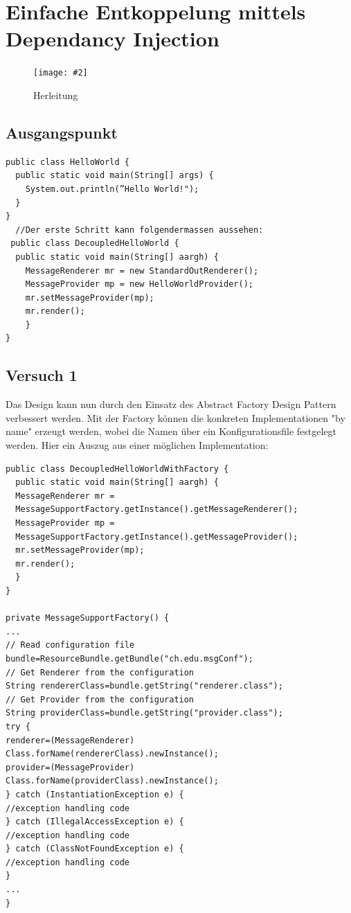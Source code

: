 \documentclass[a4paper,10pt]{scrreprt}
\newcommand{\pic}[2][figure]{\begin{figure}[h]
 \centering
 \texttt{[image: \#2]}
 \caption{#1}
\end{figure}
}
\begin{document}
\section{Einfache Entkoppelung mittels Dependancy Injection}
\pic[Herleitung]{herleitung.png}
\subsection{Ausgangspunkt}
\begin{lstlisting}[caption=Ausgangspunkt]
 public class HelloWorld {
  public static void main(String[] args) {
    System.out.println(”Hello World!");
  }
}
  //Der erste Schritt kann folgendermassen aussehen:
 public class DecoupledHelloWorld {
  public static void main(String[] aargh) {
    MessageRenderer mr = new StandardOutRenderer();
    MessageProvider mp = new HelloWorldProvider();
    mr.setMessageProvider(mp);
    mr.render();
    }
}
\end{lstlisting}

\subsection{Versuch 1}
Das Design kann nun durch den Einsatz des Abstract Factory Design Pattern verbessert werden.
Mit der Factory können die konkreten Implementationen "by name" erzeugt werden, wobei die
Namen über ein Konfigurationsfile festgelegt werden. Hier ein Auszug aus einer möglichen
Implementation:

\begin{lstlisting}[caption="Entkoppelung mit manuelles Setzten von Abhängigkeiten]
 public class DecoupledHelloWorldWithFactory {
  public static void main(String[] aargh) {
  MessageRenderer mr =
  MessageSupportFactory.getInstance().getMessageRenderer();
  MessageProvider mp =
  MessageSupportFactory.getInstance().getMessageProvider();
  mr.setMessageProvider(mp);
  mr.render();
  }
}

private MessageSupportFactory() {
...
// Read configuration file
bundle=ResourceBundle.getBundle("ch.edu.msgConf");
// Get Renderer from the configuration
String rendererClass=bundle.getString("renderer.class");
// Get Provider from the configuration
String providerClass=bundle.getString("provider.class");
try {
renderer=(MessageRenderer)
Class.forName(rendererClass).newInstance();
provider=(MessageProvider)
Class.forName(providerClass).newInstance();
} catch (InstantiationException e) {
//exception handling code
} catch (IllegalAccessException e) {
//exception handling code
} catch (ClassNotFoundException e) {
//exception handling code
}
...
}
\end{lstlisting}
\end{document}

